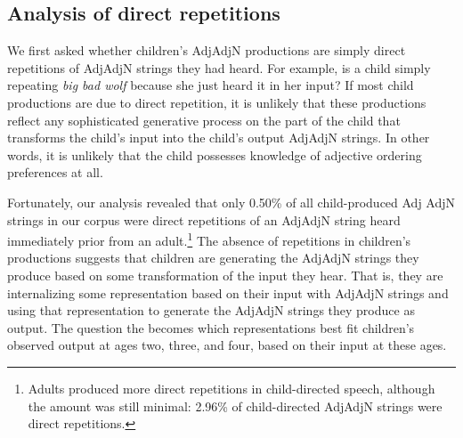 \documentclass[10pt]{article}
\newcommand{\lsp}[1]{\textcolor{violet}{[lsp: #1]}}
\begin{document}
\subsection{Analysis of direct repetitions}
We first asked whether children's AdjAdjN productions are simply direct repetitions of AdjAdjN strings they had heard. For example, is a child simply repeating \textit{big bad wolf} because she just heard it in her input? If most child productions are due to direct repetition, it is unlikely that these productions reflect any sophisticated generative process on the part of the child that transforms the child's input into the child's output AdjAdjN strings. In other words, it is unlikely that the child possesses knowledge of adjective ordering preferences at all.

Fortunately, our analysis revealed that only 0.50\% of all child-produced %
Adj AdjN
strings in our corpus were direct repetitions of an AdjAdjN string heard immediately prior from an adult.\footnote{
Adults produced more direct repetitions in child-directed speech, although the amount was still minimal:
2.96\% of child-directed AdjAdjN strings were direct repetitions.%
}
The absence of repetitions in children's productions suggests that children are generating the AdjAdjN strings they produce based on some transformation of the input they hear. That is, they are internalizing some representation based on their input with AdjAdjN strings and using that representation to generate the AdjAdjN strings they produce as output. 
The question the becomes which representations best fit children's observed output at ages two, three, and four, based on their input at these ages.
\end{document}

